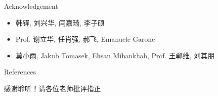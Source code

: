 \documentclass[10pt]{beamer}
\begin{document}
\begin{frame}{Acknowledgement}
  \begin{itemize}
    \item 韩铎, 刘兴华, 闫嘉琦, 李子硕
    \item Prof. 谢立华, 任肖强, 郝飞, Emanuele Garone
    \item 莫小雨, Jakub Tomasek, Ehsan Mihankhah, Prof. 王郸维, 刘其朋
  \end{itemize}
\end{frame}

\begin{frame}[allowframebreaks]{References}
  \nocite{Ren2018, Ren2018a, 9030036, Han2019, Liu2017}
      \printbibliography[heading=none]
\end{frame}

\begin{frame}[standout]
  感谢聆听！请各位老师批评指正
\end{frame}
\end{document}
